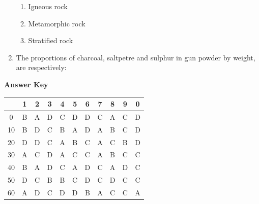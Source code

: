 \documentclass[11pt,a4paper]{article}
\begin{document}
\begin{enumerate}
\begin{enumerate}[label=\Alph*.]
\item{Igneous rock}
\item{Metamorphic rock}
\item{Stratified rock}
\end{enumerate}
\item{The proportions of charcoal, saltpetre and sulphur in gun powder by weight, are respectively:}
\\
\end{enumerate}
\textbf{Answer Key}
\begin{tabular}{ | c | c c c c c c c c c c | }
\hline
 & 1 & 2 & 3 & 4 & 5 & 6 & 7 & 8 & 9 & 0 \\
\hline
0 & B & A & D & C & D & D & C & A & C & D \\
10 & B & D & C & B & A & D & A & B & C & D \\
20 & D & D & C & A & B & C & A & C & B & D \\
30 & A & C & D & A & C & C & A & B & C & C \\
40 & B & A & D & C & A & D & C & A & D & C \\
50 & D & C & B & B & C & D & C & D & C & C \\
60 & A & D & C & D & D & B & A & C & C & A \\
\hline
\end{tabular}
\clearpage
\end{document}
